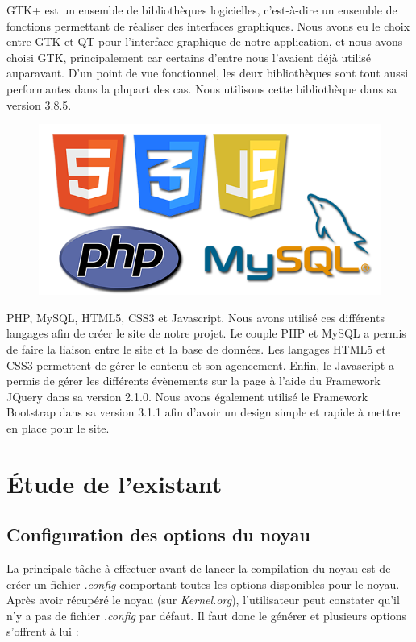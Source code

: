 ﻿\documentclass[17pts]{report}
\begin{document}
GTK+ est un ensemble de bibliothèques logicielles, c'est-à-dire un
ensemble de fonctions permettant de réaliser des interfaces graphiques.  Nous
avons eu le choix entre GTK et QT pour l'interface graphique de notre
application, et nous avons choisi GTK, principalement car certains d'entre nous
l'avaient déjà utilisé auparavant. D'un point de vue fonctionnel, les deux
bibliothèques sont tout aussi performantes dans la plupart des cas. Nous
utilisons cette bibliothèque dans sa version 3.8.5.\\

\begin{figure}[H]
    \includegraphics[scale=0.3]{illustrations/html-css-js-php-mysql.png}
    \centering
\end{figure}

PHP, MySQL, HTML5, CSS3 et Javascript. Nous avons utilisé ces différents
langages afin de créer le site de notre projet. Le couple PHP et MySQL a
permis de faire la liaison entre le site et la base de données. Les langages
HTML5 et CSS3 permettent de gérer le contenu et son agencement.  Enfin, le
Javascript a permis de gérer les différents évènements sur la page à l'aide du
Framework JQuery dans sa version 2.1.0. Nous avons également utilisé le
Framework Bootstrap dans sa version 3.1.1 afin d'avoir un design simple et
rapide à mettre en place pour le site.

\chapter{Étude de l'existant}\thispagestyle{IHA-fancy-style}
\label{cha:Étude de l'existant}
\section{Configuration des options du noyau}
\label{sec:Configuration des options du noyau}
La principale tâche à effectuer avant de lancer la compilation du noyau est de
créer un fichier \textit{.config} comportant toutes les options disponibles
pour le noyau.  Après avoir récupéré le noyau (sur \textit{Kernel.org}),
l'utilisateur peut constater qu’il n’y a pas de fichier \textit{.config} par
défaut.  Il faut donc le générer et plusieurs options s’offrent à lui : \\
\end{document}
